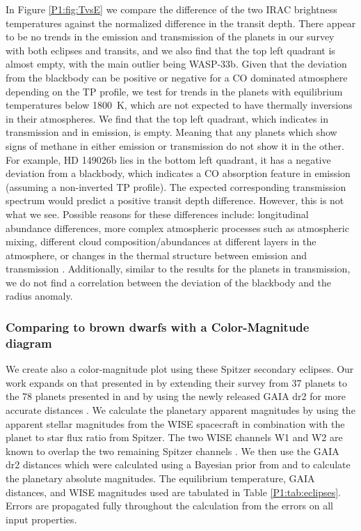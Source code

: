 In Figure \ref{P1:fig:TvsE} we compare the difference of the two IRAC brightness temperatures against the normalized difference in the transit depth. There appear to be no trends in the emission and transmission of the planets in our survey with both eclipses and transits, and we also find that the top left quadrant is almost empty, with the main outlier being WASP-33b. Given that the deviation from the blackbody can be positive or negative for a CO dominated atmosphere depending on the TP profile, we test for trends in the planets with equilibrium temperatures below 1800~K, which are not expected to have thermally inversions in their atmospheres. We find that the top left quadrant, which indicates  in transmission and  in emission, is empty. Meaning that any planets which show signs of methane in either emission or transmission do not show it in the other. For example, HD 149026b lies in the bottom left quadrant, it has a negative deviation from a blackbody, which indicates a CO absorption feature in emission (assuming a non-inverted TP profile). The expected corresponding transmission spectrum would predict a positive transit depth difference. However, this is not what we see. Possible reasons for these differences include: longitudinal abundance differences, more complex atmospheric processes such as atmospheric mixing, different cloud composition/abundances at different layers in the atmosphere, or changes in the thermal structure between emission and transmission \citep[e.g.,][]{Fortney2005}. Additionally, similar to the results for the planets in transmission, we do not find a correlation between the deviation of the blackbody and the radius anomaly.


\subsubsection{Comparing to brown dwarfs with a Color-Magnitude diagram}

We create also a color-magnitude plot using these Spitzer secondary eclipses. Our work expands on that presented in \citet{Triaud2014b} by extending their survey from 37 planets to the 78 planets presented in \citet{Baxter2020} and by using the newly released GAIA dr2 for more accurate distances \citep{GaiaCollaborationandBrown2018}. We calculate the planetary apparent magnitudes by using the apparent stellar magnitudes from the WISE spacecraft \citep{Cutri2012} in combination with the planet to star flux ratio from Spitzer. The two WISE channels W1 and W2 are known to overlap the two remaining Spitzer channels \citep{Kirkpatrick2011}. We then use the GAIA dr2 distances which were calculated using a Bayesian prior from \citet{GaiaCollaborationandBrown2018} and \citet{Bailer-Jones2018} to calculate the planetary absolute magnitudes. The equilibrium temperature, GAIA distances, and WISE magnitudes used are tabulated in Table \ref{P1:tab:eclipses}. Errors are propagated fully throughout the calculation from the errors on all input properties.

